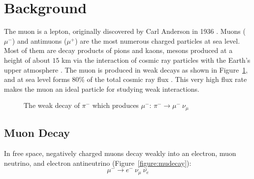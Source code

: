 
\section{Background}\label{background}

The muon is a lepton, originally discovered by Carl Anderson in 1936
\cite{anderson}. Muons ($\mu^-$) and antimuons ($\mu^+$) are the most
numerous charged particles at sea level\cite{pdg}. Most of them are
decay products of pions and kaons, mesons produced at a height of
about $15$ km via the interaction of cosmic ray particles with the
Earth's upper atmosphere \cite{amsler}. The muon is produced in weak
decays as shown in Figure~\ref{figure:pidecay}, and at sea level forms
$80\%$ of the total cosmic ray flux \cite[p.~8]{rossi}. This very high
flux rate makes the muon an ideal particle for studying weak
interactions.

\begin{figure}[h]
\begin{center}
\caption{\small{The weak decay of $\pi^-$ which produces $\mu^-$: $\pi^- \rightarrow
\mu^-~\nu_{\mu}$}}
\label{figure:pidecay}
\end{center}
\end{figure}


\subsection{Muon Decay}

In free space, negatively charged muons decay weakly into an electron,
muon neutrino, and electron antineutrino \cite{easwar}
(Figure~\ref{figure:mudecay}):
\begin{equation}\mu^- \rightarrow e^-~\nu_{\mu}~\overline{\nu_e}\label{mudecay}\end{equation}

